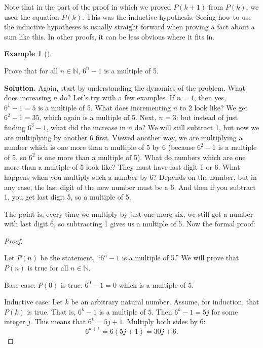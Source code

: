 \documentclass[10pt,]{book}
\theoremstyle{plain}
\theoremstyle{definition}
\newtheorem{example}[theorem]{Example}
\theoremstyle{definition}
\theoremstyle{definition}
\numberwithin{equation}{chapter}
\def\N{\mathbb N}
\begin{document}
Note that in the part of the proof in which we proved \(P(k+1)\) from \(P(k)\), we used the equation \(P(k)\). This was the inductive hypothesis. Seeing how to use the inductive hypotheses is usually straight forward when proving a fact about a sum like this. In other proofs, it can be less obvious where it fits in.
%
\begin{example}[]\label{example-80}

Prove that for all \(n \in \N\), \(6^n - 1\) is a multiple of 5.
%
\par\medskip\noindent%
\textbf{Solution.}\quad
Again, start by understanding the dynamics of the problem. What does increasing \(n\) do? Let's try with a few examples. If \(n = 1\), then yes, \(6^1 - 1 = 5\) is a multiple of 5. What does incrementing \(n\) to 2 look like? We get \(6^2 - 1 = 35\), which again is a multiple of 5. Next, \(n = 3\): but instead of just finding \(6^3 - 1\), what did the increase in \(n\) do? We will still subtract 1, but now we are multiplying by another 6 first. Viewed another way, we are multiplying a number which is one more than a multiple of 5 by 6 (because \(6^2 - 1\) is a multiple of 5, so \(6^2\) is one more than a multiple of 5). What do numbers which are one more than a multiple of 5 look like? They must have last digit 1 or 6. What happens when you multiply such a number by 6? Depends on the number, but in any case, the last digit of the new number must be a 6. And then if you subtract 1, you get last digit 5, so a multiple of 5.
%
\par

The point is, every time we multiply by just one more six, we still get a number with last digit 6, so subtracting 1 gives us a multiple of 5. Now the formal proof:
%
\begin{proof}\hypertarget{proof-15}{}

Let \(P(n)\) be the statement, ``\(6^n - 1\) is a multiple of 5.'' We will prove that \(P(n)\) is true for all \(n \in \N\).
%
\par

Base case: \(P(0)\) is true: \(6^0 -1 = 0\) which is a multiple of 5.
%
\par

Inductive case: Let \(k\) be an arbitrary natural number. Assume, for induction, that \(P(k)\) is true. That is, \(6^k - 1\) is a multiple of \(5\). Then \(6^k - 1 = 5j\) for some integer \(j\). This means that \(6^k = 5j + 1\). Multiply both sides by \(6\):
\begin{equation*}
  6^{k+1} = 6(5j+1) = 30j + 6.
\end{equation*}
%
\par


\end{proof}
\end{example}
\end{document}
